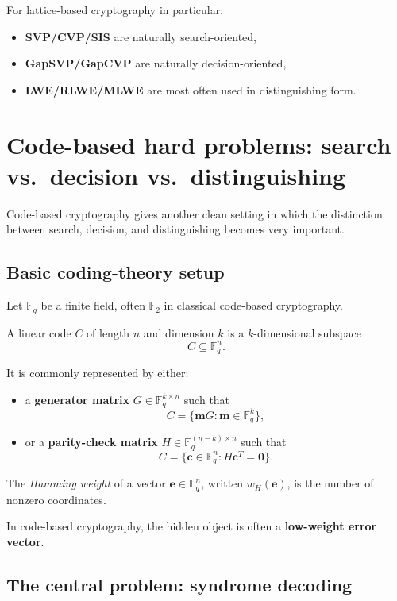 \documentclass[11pt]{article}
\begin{document}
	\noindent
	For lattice-based cryptography in particular:
	\begin{itemize}
		\item \textbf{SVP/CVP/SIS} are naturally search-oriented,
		\item \textbf{GapSVP/GapCVP} are naturally decision-oriented,
		\item \textbf{LWE/RLWE/MLWE} are most often used in distinguishing form.
	\end{itemize}

	\newpage
	\section{Code-based hard problems: search vs.\ decision vs.\ distinguishing}
	
	Code-based cryptography gives another clean setting in which the distinction between search, decision, and distinguishing becomes very important.
	
	\subsection{Basic coding-theory setup}
	
	Let $\mathbb{F}_q$ be a finite field, often $\mathbb{F}_2$ in classical code-based cryptography.
	
	A linear code $C$ of length $n$ and dimension $k$ is a $k$-dimensional subspace
	\[
	C \subseteq \mathbb{F}_q^n.
	\]
	
	It is commonly represented by either:
	
	\begin{itemize}
		\item a \textbf{generator matrix} $G \in \mathbb{F}_q^{k \times n}$ such that
		\[
		C = \{ \bm m G : \bm m \in \mathbb{F}_q^k \},
		\]
		\item or a \textbf{parity-check matrix} $H \in \mathbb{F}_q^{(n-k)\times n}$ such that
		\[
		C = \{ \bm c \in \mathbb{F}_q^n : H\bm c^T = \bm 0 \}.
		\]
	\end{itemize}
	
	The \emph{Hamming weight} of a vector $\bm e \in \mathbb{F}_q^n$, written $w_H(\bm e)$, is the number of nonzero coordinates.
	
	\medskip
	
	\noindent
	In code-based cryptography, the hidden object is often a \textbf{low-weight error vector}.
	
	\subsection{The central problem: syndrome decoding}
	
\end{document}
